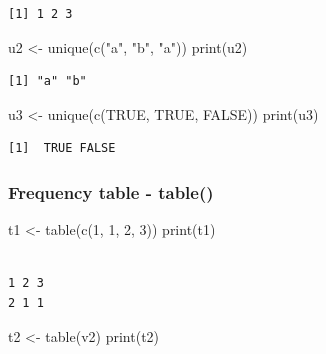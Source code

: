 \documentclass[
  letterpaper,
  DIV=11,
  numbers=noendperiod]{scrartcl}
\newenvironment{Shaded}{\begin{snugshade}}{\end{snugshade}}
\newcommand{\ConstantTok}[1]{\textcolor[rgb]{0.56,0.35,0.01}{#1}}
\newcommand{\DecValTok}[1]{\textcolor[rgb]{0.68,0.00,0.00}{#1}}
\newcommand{\FunctionTok}[1]{\textcolor[rgb]{0.28,0.35,0.67}{#1}}
\newcommand{\NormalTok}[1]{\textcolor[rgb]{0.00,0.23,0.31}{#1}}
\newcommand{\OtherTok}[1]{\textcolor[rgb]{0.00,0.23,0.31}{#1}}
\newcommand{\StringTok}[1]{\textcolor[rgb]{0.13,0.47,0.30}{#1}}
\begin{document}
\begin{verbatim}
[1] 1 2 3
\end{verbatim}

\begin{Shaded}
\begin{Highlighting}[]
\NormalTok{u2 }\OtherTok{\textless{}{-}} \FunctionTok{unique}\NormalTok{(}\FunctionTok{c}\NormalTok{(}\StringTok{"a"}\NormalTok{, }\StringTok{"b"}\NormalTok{, }\StringTok{"a"}\NormalTok{))}
\FunctionTok{print}\NormalTok{(u2)}
\end{Highlighting}
\end{Shaded}

\begin{verbatim}
[1] "a" "b"
\end{verbatim}

\begin{Shaded}
\begin{Highlighting}[]
\NormalTok{u3 }\OtherTok{\textless{}{-}} \FunctionTok{unique}\NormalTok{(}\FunctionTok{c}\NormalTok{(}\ConstantTok{TRUE}\NormalTok{, }\ConstantTok{TRUE}\NormalTok{, }\ConstantTok{FALSE}\NormalTok{))}
\FunctionTok{print}\NormalTok{(u3)}
\end{Highlighting}
\end{Shaded}

\begin{verbatim}
[1]  TRUE FALSE
\end{verbatim}

\subsubsection{Frequency table - table()}\label{frequency-table---table}

\begin{Shaded}
\begin{Highlighting}[]
\NormalTok{t1 }\OtherTok{\textless{}{-}} \FunctionTok{table}\NormalTok{(}\FunctionTok{c}\NormalTok{(}\DecValTok{1}\NormalTok{, }\DecValTok{1}\NormalTok{, }\DecValTok{2}\NormalTok{, }\DecValTok{3}\NormalTok{))}
\FunctionTok{print}\NormalTok{(t1)}
\end{Highlighting}
\end{Shaded}

\begin{verbatim}

1 2 3 
2 1 1 
\end{verbatim}

\begin{Shaded}
\begin{Highlighting}[]
\NormalTok{t2 }\OtherTok{\textless{}{-}} \FunctionTok{table}\NormalTok{(v2)}
\FunctionTok{print}\NormalTok{(t2)}
\end{Highlighting}
\end{Shaded}
\end{document}
